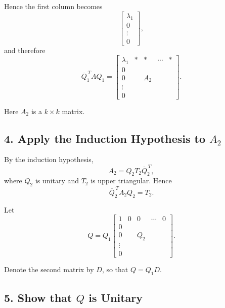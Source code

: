 \documentclass[12pt,a4paper]{article}
\begin{document}
Hence the first column becomes
\[
    \left[
        \begin{array}{c}
            \lambda_1 \\[4pt]
            0         \\[4pt]
            \vdots    \\[4pt]
            0
        \end{array}
        \right],
\]
and therefore
\[
    \boxed{
        \overline{Q}_1^{\,T}AQ_1
        =
        \left[
            \begin{array}{ccccc}
                \lambda_1 & * & *   & \cdots & * \\[5pt]
                0         &   &     &        &   \\[-3pt]
                0         &   & A_2 &        &   \\[-3pt]
                \vdots    &   &     &        &   \\[-3pt]
                0         &   &     &        &
            \end{array}
            \right].
    }
\]

Here $A_2$ is a $k\times k$ matrix.

\subsection*{4. Apply the Induction Hypothesis to $A_2$}

By the induction hypothesis,
\[
    A_2=Q_2T_2\overline{Q}_2^{\,T},
\]
where $Q_2$ is unitary and $T_2$ is upper triangular. Hence
\[
    \overline{Q}_2^{\,T}A_2Q_2=T_2.
\]

Let
\[
    Q=
    Q_1
    \left[
        \begin{array}{ccccc}
            1      & 0 & 0   & \cdots & 0 \\
            0      &   &     &        &   \\
            0      &   & Q_2 &        &   \\
            \vdots &   &     &        &   \\
            0      &   &     &        &
        \end{array}
        \right].
\]

Denote the second matrix by $D$, so that $Q=Q_1D$.

\subsection*{5. Show that $Q$ is Unitary}
\end{document}
